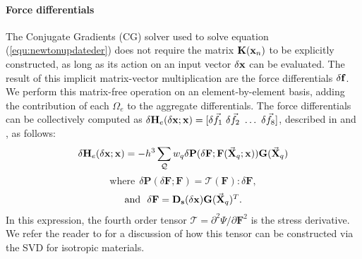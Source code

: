 \paragraph{Force differentials} The Conjugate Gradients (CG) solver
used to solve equation (\ref{equ:newtonupdateder}) does not require
the matrix $\mathbf{K}(\hbox{\boldmath $\mathbf x$}_n)$ to be explicitly
constructed, as long as its action on an input vector
$\delta\hbox{\boldmath $\mathbf x$}$ can be evaluated.  The result of this
implicit matrix-vector multiplication are the force differentials
$\delta\hbox{\boldmath $\mathbf f$}$. We perform this matrix-free operation on an
element-by-element basis, adding the contribution of each $\Omega_e$
to the aggregate differentials.  The force differentials can
be collectively computed as
$\delta\mathbf{H}_e(\delta\hbox{\boldmath $\mathbf x$};\hbox{\boldmath $\mathbf x$})=[\delta\vec{f}_1\ \delta\vec{f}_2\ \hdots\
\delta\vec{f}_8]$, described in \cite{McAdaZSETTS:2011} and \cite{PatteMS:2012}, as
follows:
\begin{equation}
\delta\mathbf{H}_e(\delta\hbox{\boldmath $\mathbf x$};\hbox{\boldmath $\mathbf
    x$})=-h^3\sum_{\mathcal Q} w_q\delta\mathbf{P}(\delta\mathbf{F};\mathbf{F}(\vec{\mathbf
    X}_q;\hbox{\boldmath $\mathbf x$}))\mathbf{G}(\vec{\mathbf X}_q)
\end{equation}
$$
\mbox{where}\ \ \mbox{$\delta\mathbf{P}(\delta\mathbf{F};\mathbf{F})=\mathcal{T}(\mathbf{F}):\delta\mathbf{F}$},
$$
$$
\mbox{and}\ \
\mbox{$\delta\mathbf{F}=\mathbf{D_s}(\delta\hbox{\boldmath $\mathbf
    x$})\mathbf{G}(\vec{\mathbf X}_q)^T$}.
$$
In this expression, the fourth order tensor
$\mathcal{T}=\partial^2\Psi/\partial\mathbf{F}^2$ is the stress
derivative. We refer the reader to \cite{TeranSIF:2005} for a
discussion of how this tensor can be constructed via the SVD for
isotropic materials.


